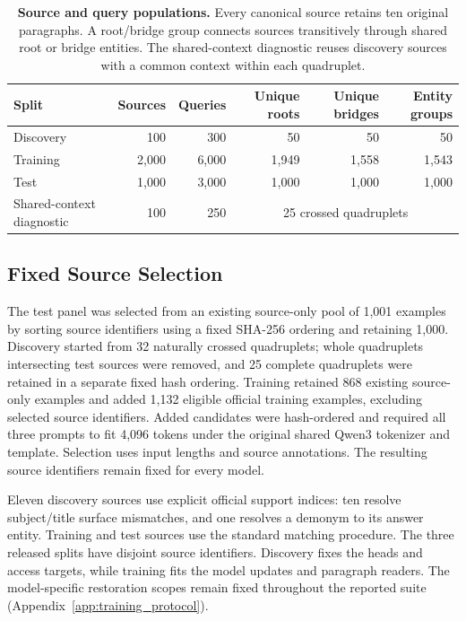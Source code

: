 \begin{table}[!htbp]
  \centering
  \caption{\textbf{Source and query populations.} Every canonical source retains ten original paragraphs. A root/bridge group connects sources transitively through shared root or bridge entities. The shared-context diagnostic reuses discovery sources with a common context within each quadruplet.}
  \label{tab:data}
  \small
  \begin{tabular}{lrrrrr}
    \toprule
    \textbf{Split} & \textbf{Sources} & \textbf{Queries} & \textbf{Unique roots} & \textbf{Unique bridges} & \textbf{Entity groups} \\
    \midrule
    Discovery & 100 & 300 & 50 & 50 & 50 \\
    Training & 2,000 & 6,000 & 1,949 & 1,558 & 1,543 \\
    Test & 1,000 & 3,000 & 1,000 & 1,000 & 1,000 \\
    \midrule
    Shared-context diagnostic & 100 & 250 & \multicolumn{3}{c}{25 crossed quadruplets} \\
    \bottomrule
  \end{tabular}
\end{table}

\subsection{Fixed Source Selection}

The test panel was selected from an existing source-only pool of 1,001 examples by sorting source identifiers using a fixed SHA-256 ordering and retaining 1,000. Discovery started from 32 naturally crossed quadruplets; whole quadruplets intersecting test sources were removed, and 25 complete quadruplets were retained in a separate fixed hash ordering. Training retained 868 existing source-only examples and added 1,132 eligible official training examples, excluding selected source identifiers. Added candidates were hash-ordered and required all three prompts to fit 4,096 tokens under the original shared Qwen3 tokenizer and template. Selection uses input lengths and source annotations. The resulting source identifiers remain fixed for every model.

Eleven discovery sources use explicit official support indices: ten resolve subject/title surface mismatches, and one resolves a demonym to its answer entity. Training and test sources use the standard matching procedure. The three released splits have disjoint source identifiers. Discovery fixes the heads and access targets, while training fits the model updates and paragraph readers. The model-specific restoration scopes remain fixed throughout the reported suite (Appendix~\ref{app:training_protocol}).

